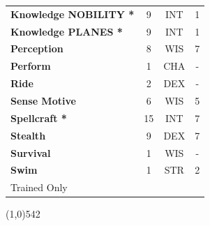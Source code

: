 \documentclass[letterpaper]{article}
\newcommand{\fullline}{\line(1,0){542} \\}
\newcommand{\B}[1]{\textbf{#1}}
\begin{document}
\begin{table}[h!]
{{\begin{tabular}{l  c  c  c}
        \hline
        \B{Knowledge {\scriptsize NOBILITY} *} & 9 & {\footnotesize INT} & 1 \\
        \B{Knowledge {\scriptsize PLANES} *} & 9 & {\footnotesize INT} & 1 \\
        \hline
        \B{Perception} & 8 & {\footnotesize WIS} & 7 \\
        \B{Perform} & 1 & {\footnotesize CHA} & - \\
        \hline
        \B{Ride} & 2 & {\footnotesize DEX} & - \\
        \B{Sense Motive} & 6 & {\footnotesize WIS} & 5 \\
        \hline
        \B{Spellcraft *} & 15 & {\footnotesize INT} & 7 \\
        \B{Stealth} & 9 & {\footnotesize DEX} & 7 \\
        \hline
        \B{Survival} & 1 & {\footnotesize WIS} & - \\
        \B{Swim} & 1 & {\footnotesize STR} & 2 \\
        {\footnotesize * Trained Only} \\
        \end{tabular}
    }
}
\vspace{-1.5em}
\end{table} \par

\vspace{-1.5em}
\fullline
\vspace{-1em}
\end{document}
